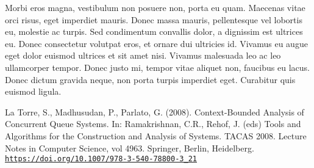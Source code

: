 \documentclass[a4paper,UKenglish,cleveref, autoref, thm-restate]{lipics-v2019}
\begin{document}
Morbi eros magna, vestibulum non posuere non, porta eu quam. Maecenas vitae orci risus, eget imperdiet mauris. Donec massa mauris, pellentesque vel lobortis eu, molestie ac turpis. Sed condimentum convallis dolor, a dignissim est ultrices eu. Donec consectetur volutpat eros, et ornare dui ultricies id. Vivamus eu augue eget dolor euismod ultrices et sit amet nisi. Vivamus malesuada leo ac leo ullamcorper tempor. Donec justo mi, tempor vitae aliquet non, faucibus eu lacus. Donec dictum gravida neque, non porta turpis imperdiet eget. Curabitur quis euismod ligula. 


\begin{thebibliography}{9}

    La Torre, S., Madhusudan, P., Parlato, G. (2008). Context-Bounded Analysis of Concurrent Queue Systems. In: Ramakrishnan, C.R., Rehof, J. (eds) Tools and Algorithms for the Construction and Analysis of Systems. TACAS 2008. Lecture Notes in Computer Science, vol 4963. Springer, Berlin, Heidelberg. \href{https://doi.org/10.1007/978-3-540-78800-3_21}{\texttt{https://doi.org/10.1007/978-3-540-78800-3\_21}}


    \end{thebibliography}
\end{document}

